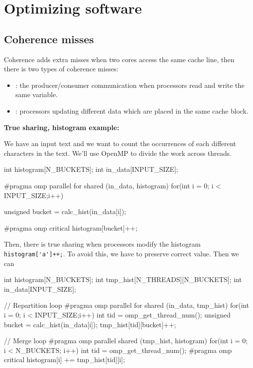 \section{Optimizing software}
\subsection{Coherence misses}
    \begin{tcolorbox}[vert]
        Coherence adds extra misses when two cores access the same cache line, then there is two types of coherence misses:
        \begin{itemize}[left=10pt, label=\textbullet]
            \item {}: the producer/consumer communication when processors read and write the same variable. 
            \item {}: processors updating different data which are placed in the same cache block.
        \end{itemize}
    \end{tcolorbox}
    \textbf{True sharing, histogram example:}
    \begin{tcolorbox}[gris]
        We have an input text and we want to count the occurrences of each different characters in the text. We'll use OpenMP to divide the work across threads.
    \end{tcolorbox}
    \begin{codeCenter}
    \begin{Ccode}
int histogram[N_BUCKETS];
int in_data[INPUT_SIZE];

#pragma omp parallel for shared (in_data, histogram)
for(int i = 0; i < INPUT_SIZE;i++) {
    unsigned bucket = calc_hist(in_data[i]);

    #pragma omp critical
    histogram[bucket]++;
}
    \end{Ccode}
    \end{codeCenter}
    Then, there is true sharing when processors modify the histogram \lstinline!histogram['a']++;!. To avoid this, we have to preserve correct value. Then we can \begin{codeCenter}
    \begin{Ccode}
int histogram[N_BUCKETS];
int tmp_hist[N_THREADS][N_BUCKETS];
int in_data[INPUT_SIZE];

// Repartition loop
#pragma omp parallel for shared (in_data, tmp_hist)
for(int i = 0; i < INPUT_SIZE;i++) {
    int tid = omp_get_thread_num();
    unsigned bucket = calc_hist(in_data[i]);
    tmp_hist[tid][bucket]++;
}

// Merge loop
#pragma omp parallel shared (tmp_hist, histogram)
for(int i = 0; i < N_BUCKETS; i++) {
    int tid = omp_get_thread_num();
    #pragma omp critical
    histogram[i] += tmp_hist[tid][i];
}
    \end{Ccode}
    \end{codeCenter}

